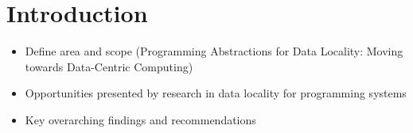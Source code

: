 \chapter{Introduction}
\label{ch:intro}
\begin{itemize}
\item Define area and scope (Programming Abstractions for Data Locality: Moving towards Data-Centric Computing)
\item Opportunities presented by research in data locality for programming systems
\item Key overarching findings and recommendations
\end{itemize}
